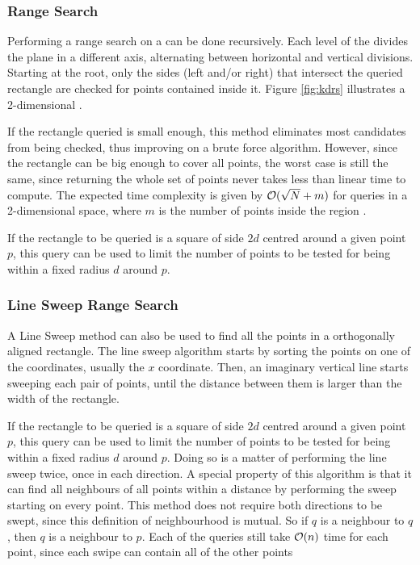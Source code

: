 \subsubsection*{\kdTree Range Search}
\label{sect:kdrs}
Performing a range search on a \kdtree can be done recursively. Each level of the \kdtree divides the plane in a different axis, alternating between horizontal and vertical divisions. Starting at the root, only the sides (left and/or right) that intersect the queried rectangle are checked for points contained inside it. Figure \ref{fig:kdrs} illustrates a 2-dimensional \kdtree.



If the rectangle queried is small enough, this method eliminates most candidates from being checked, thus improving on a brute force algorithm. However, since the rectangle can be big enough to cover all points, the worst case is still the same, since returning the whole set of points never takes less than linear time to compute. The expected time complexity is given by $\mathcal{O}(\sqrt{N}+m)$ for queries in a 2-dimensional space, where $m$ is the number of points inside the region \cite{kdrange}.
	
If the rectangle to be queried is a square of side $2d$ centred around a given point $p$, this query can be used to limit the number of points to be tested for being within a fixed radius $d$ around $p$.

\subsubsection*{Line Sweep Range Search}
\label{sect:lsrs}
A Line Sweep method can also be used to find all the points in a orthogonally aligned rectangle. The line sweep algorithm starts by sorting the points on one of the coordinates, usually the $x$ coordinate. Then, an imaginary vertical line starts sweeping each pair of points, until the distance between them is larger than the width of the rectangle.



If the rectangle to be queried is a square of side $2d$ centred around a given point $p$, this query can be used to limit the number of points to be tested for being within a fixed radius $d$ around $p$. Doing so is a matter of performing the line sweep twice, once in each direction. A special property of this algorithm is that it can find all neighbours of all points within a distance by performing the sweep starting on every point. This method does not require both directions to be swept, since this definition of neighbourhood is mutual. So if $q$ is a neighbour to $q$, then $q$ is a neighbour to $p$. Each of the queries still take $\mathcal{O}(n)$  time for each point, since each swipe can contain all of the other points

